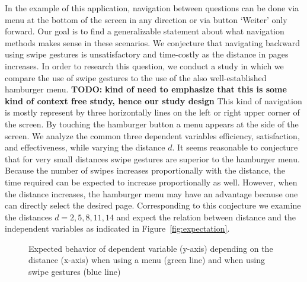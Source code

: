 \documentclass{sig-alternate-05-2015}
\newcommand{\todo}{\textbf{TODO:} \textbf}
\begin{document}
In the example of this application, navigation between questions can be done via menu at the bottom of the screen in any direction or via button `Weiter' only forward. 
Our goal is to find a generalizable statement about what navigation methods makes sense in these scenarios. 
We conjecture that navigating backward using swipe gestures is unsatisfactory and time-costly as the distance in pages increases. 
In order to research this question, we conduct a study in which we compare the use of swipe gestures to the use of the also well-established hamburger menu. 
\todo{kind of need to emphasize that this is some kind of context free study, hence our study design} 
This kind of navigation is mostly represent by three horizontally lines on the left or right upper corner of the screen. 
By touching the hamburger button a menu appears at the side of the screen.
We analyze the common three dependent variables efficiency, satisfaction, and effectiveness, while varying the distance $d$.
It seems reasonable to conjecture
that for very small distances swipe gestures are superior to the hamburger
menu. Because the number of swipes increases proportionally with the distance, the time required can be expected to increase 
proportionally as well. However, when the distance increases, the hamburger menu
may have an advantage because one can directly select the desired page. Corresponding to this conjecture we examine the distances $d = 2, 5, 8, 11, 14$ and
expect the relation between distance and the independent variables as indicated in Figure~\ref{fig:expectation}.
\begin{figure}
	\caption{Expected behavior of dependent variable (y-axis) depending on the distance (x-axis) when using a menu (green line) and when using swipe gestures (blue line)}
\end{figure}
\end{document}
